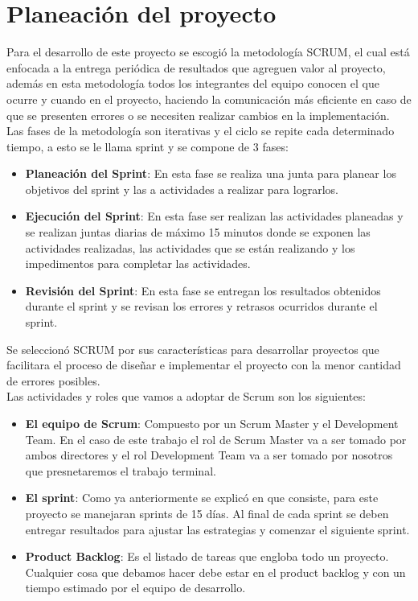 
\clearpage
\section{Planeación del proyecto}
Para el desarrollo de este proyecto se escogió la metodología SCRUM, el cual está enfocada a la
entrega periódica de resultados que agreguen valor al proyecto, además en esta metodología todos los integrantes del
equipo conocen el que ocurre y cuando en el proyecto, haciendo la comunicación más eficiente en caso de que se presenten errores
o se necesiten realizar cambios en la implementación.\\
Las fases de la metodología son iterativas y el ciclo se repite cada determinado tiempo, a esto se le llama
sprint y se compone de 3 fases:

 \begin{itemize}
    \item \textbf{Planeación del Sprint}: En esta fase se realiza una junta para planear los objetivos del sprint y las a actividades
    a realizar para lograrlos.
    \item \textbf{Ejecución del Sprint}: En esta fase ser realizan las actividades planeadas y se realizan juntas diarias de máximo
    15 minutos donde se exponen las actividades realizadas, las actividades que se están realizando y los
    impedimentos para completar las actividades.
    \item \textbf{Revisión del Sprint}: En esta fase se entregan los resultados obtenidos durante el sprint y se revisan los errores
    y retrasos ocurridos durante el sprint.
 \end{itemize}



Se seleccionó SCRUM por sus características para desarrollar proyectos que facilitara el proceso de diseñar e
implementar el proyecto con la menor cantidad de errores posibles.\\

Las actividades y roles que vamos a adoptar de Scrum son los siguientes:
\begin{itemize}
    \item \textbf{El equipo de Scrum}: Compuesto por un Scrum Master y el Development Team. En el caso de este trabajo el
rol de Scrum Master va a ser tomado por ambos directores y el rol Development Team va a ser tomado por
nosotros que presnetaremos el trabajo terminal.
    \item \textbf{El sprint}: Como ya anteriormente se explicó en que consiste, para este proyecto se manejaran sprints de 15
días. Al final de cada sprint se deben entregar resultados para ajustar las estrategias y comenzar el siguiente
sprint.
    \item \textbf{Product Backlog}: Es el listado de tareas que engloba todo un proyecto. Cualquier cosa que debamos hacer
debe estar en el product backlog y con un tiempo estimado por el equipo de desarrollo.
\end{itemize}


